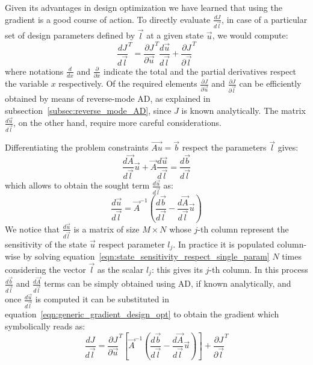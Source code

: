 \bigskip
Given its advantages in design optimization we have learned that using the gradient is a good course of action. To directly evaluate $\frac{dJ}{d\vec{l}}$, in case of a particular set of design parameters defined by $\vec{l}$ at a given state $\vec{u}$, we would compute:
\begin{equation}
	\label{eqn:generic_gradient_design_opt}
	\frac{dJ}{d\vec{l}}^T = \frac{\partial J}{\partial \vec{u}}^T \frac{d\vec{u}}{d\vec{l}} + \frac{\partial J}{\partial \vec{l}}^T
\end{equation}
where notations $\frac{d}{dx}$ and $\frac{\partial}{\partial x}$ indicate the total and the partial derivatives respect the variable $x$ respectively.
Of the required elements $\frac{\partial J}{\partial \vec{u}}$ and $\frac{\partial J}{\partial \vec{l}}$ can be efficiently obtained by means of reverse-mode AD, as explained in subsection~\vref{subsec:reverse_mode_AD}, since $J$ is known analytically. The matrix $\frac{d\vec{u}}{d\vec{l}}$, on the other hand, require more careful considerations.

Differentiating the problem constraints $\vec{Au} = \vec{b}$ respect the parameters $\vec{l}$ gives:
\begin{equation}
	\frac{d\vec{A}}{d\vec{l}} \vec{u} + \vec{A} \frac{d\vec{u}}{d\vec{l}} = \frac{d\vec{b}}{d\vec{l}}
\end{equation}
which allows to obtain the sought term $\frac{d\vec{u}}{d\vec{l}}$ as:
\begin{equation}
	\label{eqn:state_sensitivity_respect_single_param}
	\frac{d\vec{u}}{d\vec{l}} = \vec{A}^{-1} \left( \frac{d\vec{b}}{d\vec{l}} - \frac{d\vec{A}}{d\vec{l}}\vec{u} \right)
\end{equation}
We notice that $\frac{d\vec{u}}{d\vec{l}}$ is a matrix of size $M \times N$ whose $j$-th column represent the sensitivity of the state $\vec{u}$ respect parameter $l_j$. In practice it is populated column-wise by solving equation~\eqref{eqn:state_sensitivity_respect_single_param} $N$ times considering the vector $\vec{l}$ as the scalar $l_j$: this gives its $j$-th column. In this process $\frac{d\vec{b}}{d\vec{l}}$ and $\frac{d\vec{A}}{d\vec{l}}$ terms can be simply obtained using AD, if known analytically, and once $\frac{d\vec{u}}{d\vec{l}}$ is computed it can be substituted in equation~\eqref{eqn:generic_gradient_design_opt} to obtain the gradient which symbolically reads as:
\begin{equation}
	\label{eqn:generic_gradient_design_opt_naive}
	\frac{dJ}{d\vec{l}} = \frac{\partial J}{\partial \vec{u}}^T \left[ \vec{A}^{-1} \left( \frac{d\vec{b}}{d\vec{l}} - \frac{d\vec{A}}{d\vec{l}}\vec{u} \right) \right]  + \frac{\partial J}{\partial \vec{l}}^T
\end{equation}

